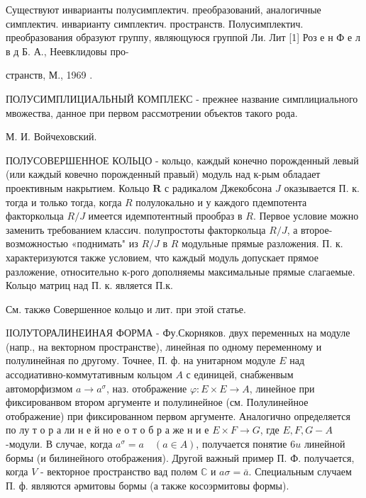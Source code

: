 \documentclass[10pt]{article}
\begin{document}
Существуют инварианты полусимплектич. преобразований, аналогичные симплектич. инварианту симплектич. пространств. Полусимплектич. преобразования образуют группу, являющуюся группой Ли. Лит [1] Роз е н Ф е л в д Б. А., Неевклидовы про-

странств, М., 1969 .



ПОЛУСИМПЛИЦИАЛЬНЫЙ КОМПЛЕКС - прежнее название симплициального мвожества, данное при первом рассмотрении объектов такого рода.



М. И. Войчеховский.



ПОЛУСОВЕРШЕННОЕ КОЛЬЦО - кольцо, каждый конечно порожденный левый (или каждый ковечно порожденный правый) модуль над к-рым обладает проективным накрытием. Кольцо $\boldsymbol{R}$ с радикалом Джекобсона $J$ оказывается П. к. тогда и только тогда, когда $R$ полулокально и у каждого пдемпотента факторкольца $R / J$ имеется идемпотентный прообраз в $R$. Первое условие можно заменить требованием классич. полупростоты факторкольца $R / J$, а второе- возможностью «поднимать" из $R / J$ в $R$ модульные прямые разложения. П. к. характеризуются также условием, что каждый модуль допускает прямое разложение, относительно к-рого дополняемы максимальные прямые слагаемые. Кольцо матриц над П. к. является П.к.



См. такжө Совершенное кольцо и лит. при этой статье.



IІОЛУТОРАЛИНЕИНАЯ ФОРМА - Фу.Скорняков. двух переменных на модуле (напр., на векторном пространстве), линейная по одному переменному и полулинейная по другому. Точнее, П. ф. на унитарном модуле $E$ над ассодиативно-коммутативным кольцом $A$ с единицей, снабженвым автоморфизмом $a \rightarrow a^{\sigma}$, наз. отображение $\varphi: E \times E \rightarrow A$, линейное при фиксированвом втором аргументе и полулинейное (см. Полулинейное отображение) при фиксированном первом аргументе. Аналогично определяется по лу т о р а ли н е й но е о т о б р а же н и е $E \times F \rightarrow G$, где $E, F, G-A$-модули. В случае, когда $a^{\sigma}=a \quad(a \in A)$, получается понятие $6 u$ линейной бормы (и билинейного отображения). Другой важный пример П. Ф. получается, когда $V$ - векторное пространство вад полөм $\mathbb{C}$ и $a \sigma=\bar{a}$. Специальным случаем П. ф. являются әрмитовы бормы (а также косоэрмитовы формы).
\end{document}
